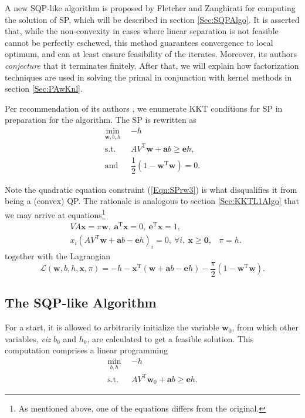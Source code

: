 \documentclass[11pt,a4paper]{article}
\theoremstyle{definition}
\renewcommand{\vec}[1]{\boldsymbol{#1}}
\begin{document}
    A new SQP-like algorithm is proposed by Fletcher and Zanghirati \cite{fletcher2010binary} for computing the solution of SP, which will be described in section \ref{Sec:SQPAlgo}. It is asserted that, while the non-convexity in cases where linear separation is not feasible cannot be perfectly eschewed, this method guarantees convergence to local optimum, and can at least ensure feasibility of the iterates. Moreover, its authors \emph{conjecture} that it terminates finitely. After that, we will explain how factorization techniques are used in solving the primal in conjunction with kernel methods in section \ref{Sec:PAwKnl}.

    Per recommendation of its authors \cite{fletcher2010binary}, we enumerate KKT conditions for SP in preparation for the algorithm. The SP is rewritten as
    \begin{align}
      \min_{\vec{w},b,h}~~ & -h \label{Eqn:SPrw1}\\
      \text{s.t.}~~ & AV^{\mathrm{T}}\vec{w}+\vec{a}b\geq\vec{e}h, \label{Eqn:SPrw2}\\
      \text{and}~~ & \dfrac{1}{2}(1-\vec{w}^{\mathrm{T}}\vec{w})=0. \label{Eqn:SPrw3}
    \end{align}

    Note the quadratic equation constraint (\ref{Eqn:SPrw3}) is what disqualifies it from being a (convex) QP. The rationale is analogous to section \ref{Sec:KKTL1Algo} that we may arrive at equations\footnote{As mentioned above, one of the equations differs from the original.}
    \begin{align}
      & VA\vec{x}=\pi\vec{w},~\vec{a}^{\mathrm{T}}\vec{x}=0,~\vec{e}^{\mathrm{T}}\vec{x}=1,\\
      & x_{i}(AV^{\mathrm{T}}\vec{w}+\vec{a}b-\vec{e}h)_{i}=0,~\forall i,~\vec{x}\geq\vec{0},
      & \pi=h. \label{Eqn:piEQh}
    \end{align}
    together with the Lagrangian
    \begin{equation}
      \mathcal{L}(\vec{w},b,h,\vec{x},\pi)=-h-\vec{x}^{\mathrm{T}}(\vec{w}+\vec{a}b-\vec{e}h)-\dfrac{\pi}{2}(1-\vec{w}^{\mathrm{T}}\vec{w}).
    \end{equation}

    \subsection{The SQP-like Algorithm\label{Sec:SQPAlgo}}
      For a start, it is allowed to arbitrarily initialize the variable $\vec{w}_{0}$, from which other variables, \textit{viz} $b_{0}$ and $h_{0}$, are calculated to get a feasible solution. This computation comprises a linear programming
      \begin{align}
        \min_{b,h}~~ & -h \label{Eqn:SQPinit1}\\
        \text{s.t.}~~ & AV^{\mathrm{T}}\vec{w}_{0}+\vec{a}b\geq\vec{e}h. \label{Eqn:SQPinit2}
      \end{align}
\end{document}
